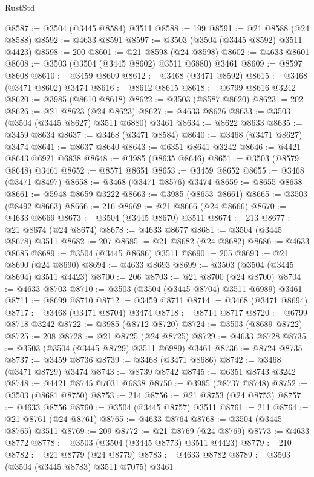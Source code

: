 \begin{lexlean}{RustStd}
\begin{coremodule}
@8587 := @3504 (@3445 @8584) @3511
@8588 := 199
@8591 := @21 @8588 (@24 @8588)
@8592 := @4633 @8591
@8597 := @3503 (@3504 (@3445 @8592) @3511 @4423)
@8598 := 200
@8601 := @21 @8598 (@24 @8598)
@8602 := @4633 @8601
@8608 := @3503 (@3504 (@3445 @8602) @3511 @6880) @3461
@8609 := @8597 @8608
@8610 := @3459 @8609
@8612 := @3468 (@3471 @8592)
@8615 := @3468 (@3471 @8602) @3474
@8616 := @8612 @8615
@8618 := @6799 @8616 @3242
@8620 := @3985 (@8610 @8618)
@8622 := @3503 (@8587 @8620)
@8623 := 202
@8626 := @21 @8623 (@24 @8623)
@8627 := @4633 @8626
@8633 := @3503 (@3504 (@3445 @8627) @3511 @6880) @3461
@8634 := @8622 @8633
@8635 := @3459 @8634
@8637 := @3468 (@3471 @8584)
@8640 := @3468 (@3471 @8627) @3474
@8641 := @8637 @8640
@8643 := @6351 @8641 @3242
@8646 := @4421 @8643 @6921 @6838
@8648 := @3985 (@8635 @8646)
@8651 := @3503 (@8579 @8648) @3461
@8652 := @8571 @8651
@8653 := @3459 @8652
@8655 := @3468 (@3471 @8497)
@8658 := @3468 (@3471 @8576) @3474
@8659 := @8655 @8658
@8661 := @5948 @8659 @3222
@8663 := @3985 (@8653 @8661)
@8665 := @3503 (@8492 @8663)
@8666 := 216
@8669 := @21 @8666 (@24 @8666)
@8670 := @4633 @8669
@8673 := @3504 (@3445 @8670) @3511
@8674 := 213
@8677 := @21 @8674 (@24 @8674)
@8678 := @4633 @8677
@8681 := @3504 (@3445 @8678) @3511
@8682 := 207
@8685 := @21 @8682 (@24 @8682)
@8686 := @4633 @8685
@8689 := @3504 (@3445 @8686) @3511
@8690 := 205
@8693 := @21 @8690 (@24 @8690)
@8694 := @4633 @8693
@8699 := @3503 (@3504 (@3445 @8694) @3511 @4423)
@8700 := 206
@8703 := @21 @8700 (@24 @8700)
@8704 := @4633 @8703
@8710 := @3503 (@3504 (@3445 @8704) @3511 @6989) @3461
@8711 := @8699 @8710
@8712 := @3459 @8711
@8714 := @3468 (@3471 @8694)
@8717 := @3468 (@3471 @8704) @3474
@8718 := @8714 @8717
@8720 := @6799 @8718 @3242
@8722 := @3985 (@8712 @8720)
@8724 := @3503 (@8689 @8722)
@8725 := 208
@8728 := @21 @8725 (@24 @8725)
@8729 := @4633 @8728
@8735 := @3503 (@3504 (@3445 @8729) @3511 @6989) @3461
@8736 := @8724 @8735
@8737 := @3459 @8736
@8739 := @3468 (@3471 @8686)
@8742 := @3468 (@3471 @8729) @3474
@8743 := @8739 @8742
@8745 := @6351 @8743 @3242
@8748 := @4421 @8745 @7031 @6838
@8750 := @3985 (@8737 @8748)
@8752 := @3503 (@8681 @8750)
@8753 := 214
@8756 := @21 @8753 (@24 @8753)
@8757 := @4633 @8756
@8760 := @3504 (@3445 @8757) @3511
@8761 := 211
@8764 := @21 @8761 (@24 @8761)
@8765 := @4633 @8764
@8768 := @3504 (@3445 @8765) @3511
@8769 := 209
@8772 := @21 @8769 (@24 @8769)
@8773 := @4633 @8772
@8778 := @3503 (@3504 (@3445 @8773) @3511 @4423)
@8779 := 210
@8782 := @21 @8779 (@24 @8779)
@8783 := @4633 @8782
@8789 := @3503 (@3504 (@3445 @8783) @3511 @7075) @3461

\end{coremodule}
\end{lexlean}

